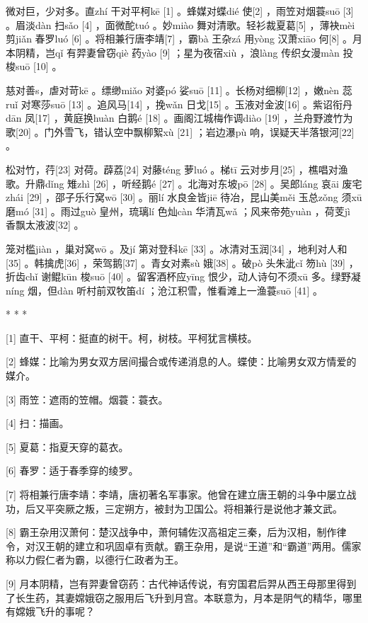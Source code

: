 \documentclass[12pt,UTF8]{ctexbook}
\begin{document}
微对巨，少对多。直zhí 干对平柯kē [1] 。蜂媒对蝶dié 使[2] ，雨笠对烟蓑suō [3] 。眉淡dàn 扫sǎo [4] ，面微酡tuó 。妙miào 舞对清歌。轻衫裁夏葛[5] ，薄袂mèi 剪jiǎn 春罗luó [6] 。将相兼行唐李靖[7] ，霸bà 王杂zá 用yòng 汉萧xiāo 何[8] 。月本阴精，岂qǐ 有羿妻曾窃qiè 药yào [9] ；星为夜宿xiù ，浪làng 传织女漫màn 投梭suō [10] 。

慈对善s，虐对苛kē 。缥缈miǎo 对婆pó 娑suō [11] 。长杨对细柳[12] ，嫩nèn 蕊ruǐ 对寒莎suō [13] 。追风马[14] ，挽wǎn 日戈[15] 。玉液对金波[16] 。紫诏衔丹dān 凤[17] ，黄庭换huàn 白鹅é [18] 。画阁江城梅作调diào [19] ，兰舟野渡竹为歌[20] 。门外雪飞，错认空中飘柳絮xù [21] ；岩边瀑pù 响，误疑天半落银河[22] 。

松对竹，荇[23] 对荷。薜荔[24] 对藤téng 萝luó 。梯tī 云对步月[25] ，樵唱对渔歌。升鼎dǐng 雉zhì [26] ，听经鹅é [27] 。北海对东坡pō [28] 。吴郎láng 哀āi 废宅zhái [29] ，邵子乐行窝wō [30] 。丽lí 水良金皆jiē 待冶，昆山美měi 玉总zǒng 须xū 磨mó [31] 。雨过guò 皇州，琉璃lí 色灿càn 华清瓦wǎ ；风来帝苑yuàn ，荷芰jì 香飘太液波[32] 。

笼对槛jiàn ，巢对窝wō 。及jí 第对登科kē [33] 。冰清对玉润[34] ，地利对人和[35] 。韩擒虎[36] ，荣驾鹅[37] 。青女对素sù 娥[38] 。破pò 头朱泚cǐ 笏hù [39] ，折齿chǐ 谢鲲kūn 梭suō [40] 。留客酒杯应yīng 恨少，动人诗句不须xū 多。绿野凝níng 烟，但dàn 听村前双牧笛dí ；沧江积雪，惟看滩上一渔蓑suō [41] 。



* * *



[1] 直干、平柯：挺直的树干。柯，树枝。平柯犹言横枝。

[2] 蜂媒：比喻为男女双方居间撮合或传递消息的人。蝶使：比喻男女双方情爱的媒介。

[3] 雨笠：遮雨的笠帽。烟蓑：蓑衣。

[4] 扫：描画。

[5] 夏葛：指夏天穿的葛衣。

[6] 春罗：适于春季穿的绫罗。

[7] 将相兼行唐李靖：李靖，唐初著名军事家。他曾在建立唐王朝的斗争中屡立战功，后又平突厥之叛，三定朔方，被封为卫国公。将相兼行是说他才兼文武。

[8] 霸王杂用汉萧何：楚汉战争中，萧何辅佐汉高祖定三秦，后为汉相，制作律令，对汉王朝的建立和巩固卓有贡献。霸王杂用，是说“王道”和“霸道”两用。儒家称以力假仁者为霸，以德行仁政者为王。

[9] 月本阴精，岂有羿妻曾窃药：古代神话传说，有穷国君后羿从西王母那里得到了长生药，其妻嫦娥窃之服用后飞升到月宫。本联意为，月本是阴气的精华，哪里有嫦娥飞升的事呢？
\end{document}
